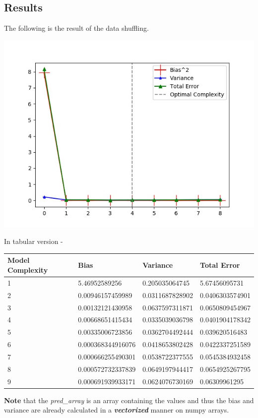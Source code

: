 \documentclass[11pt]{article}
\begin{document}
	\subsection{Results}
	The following is the result of the data shuffling. 
	\begin{center}
		\hspace{-1.5cm}\includegraphics[scale=0.8]{../q1.jpg}		
	\end{center}
	In tabular version - 
\begin{center}
	\begin{tabular}{|l|l|l|l|}
		\hline
		\textbf{Model Complexity} & \textbf{Bias}     & \textbf{Variance} & \textbf{Total Error} \\ \hline
		1                         & 5.46952589256     & 0.205035064745    & 5.67456095731        \\ \hline
		2                         & 0.00946157459989  & 0.0311687828902   & 0.0406303574901      \\ \hline
		3                         & 0.00132121430958  & 0.0637597311871   & 0.0650809454967      \\ \hline
		4                         & 0.00668651415434  & 0.0335039036798   & 0.0401904178342      \\ \hline
		5                         & 0.00335006723856  & 0.0362704492444   & 0.039620516483       \\ \hline
		6                         & 0.000368344916076 & 0.0418653802428   & 0.0422337251589      \\ \hline
		7                         & 0.000666255490301 & 0.0538722377555   & 0.0545384932458      \\ \hline
		8                         & 0.000572732337839 & 0.0649197944417   & 0.0654925267795      \\ \hline
		9                         & 0.000691939933171 & 0.0624076730169   & 0.06309961295        \\ \hline
	\end{tabular}
\end{center}
		\textbf{Note} that the \textit{pred\_array} is an array containing the values and thus the bias and variance are already calculated in a \textbf{\textit{vectorized}} manner on numpy arrays.
\end{document}
